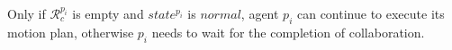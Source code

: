 \documentclass[journal]{IEEEtran}
\begin{document}
%
%
%
%
Only if $\mathcal{R}^{p_i}_c$ is empty and $state^{p_i}$ is $normal$, agent $p_i$ can continue to execute its motion plan, otherwise $p_i$ needs to wait for the completion of collaboration.
\end{document}
